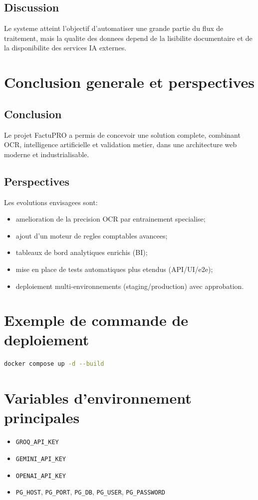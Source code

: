 \documentclass[12pt,a4paper]{report}
\begin{document}
\section{Discussion}
Le systeme atteint l'objectif d'automatiser une grande partie du flux de traitement, mais la qualite des donnees depend de la lisibilite documentaire et de la disponibilite des services IA externes.

\chapter{Conclusion generale et perspectives}
\section{Conclusion}
Le projet FactuPRO a permis de concevoir une solution complete, combinant OCR, intelligence artificielle et validation metier, dans une architecture web moderne et industrialisable.

\section{Perspectives}
Les evolutions envisagees sont:
\begin{itemize}
    \item amelioration de la precision OCR par entrainement specialise;
    \item ajout d'un moteur de regles comptables avancees;
    \item tableaux de bord analytiques enrichis (BI);
    \item mise en place de tests automatiques plus etendus (API/UI/e2e);
    \item deploiement multi-environnements (staging/production) avec approbation.
\end{itemize}

\appendix
\chapter{Exemple de commande de deploiement}
\begin{lstlisting}[language=bash]
docker compose up -d --build
\end{lstlisting}

\chapter{Variables d'environnement principales}
\begin{itemize}
    \item \texttt{GROQ\_API\_KEY}
    \item \texttt{GEMINI\_API\_KEY}
    \item \texttt{OPENAI\_API\_KEY}
    \item \texttt{PG\_HOST}, \texttt{PG\_PORT}, \texttt{PG\_DB}, \texttt{PG\_USER}, \texttt{PG\_PASSWORD}
\end{itemize}
\end{document}
